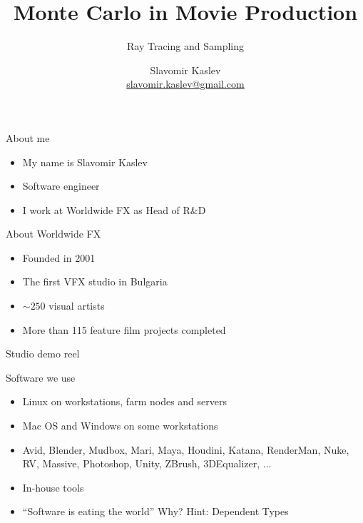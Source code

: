 \documentclass[pdf]
{beamer}
\title{Monte Carlo in Movie Production}
\subtitle{Ray Tracing and Sampling}
\author{Slavomir Kaslev \\
  \href{mailto:slavomir.kaslev@gmail.com}{slavomir.kaslev@gmail.com}}
\begin{document}
\begin{frame}
  \titlepage
\end{frame}

\begin{frame}{About me}
  \begin{itemize}
    \pause
  \item My name is Slavomir Kaslev
    \pause
  \item Software engineer
    \pause
  \item I work at Worldwide FX as Head of R\&D
  \end{itemize}
\end{frame}

\begin{frame}{About Worldwide FX}
  \begin{itemize}
    \pause
  \item Founded in 2001
    \pause
  \item The first VFX studio in Bulgaria
    \pause
  \item $\sim 250$ visual artists
    \pause
  \item More than 115 feature film projects completed
  \end{itemize}
\end{frame}

\begin{frame}{Studio demo reel}
\end{frame}

\begin{frame}{Software we use}
  \begin{itemize}
    \pause
  \item Linux on workstations, farm nodes and servers
    \pause
  \item Mac OS and Windows on some workstations
    \pause
  \item Avid, Blender, Mudbox, Mari, Maya, Houdini, Katana, RenderMan, Nuke, RV, Massive, Photoshop, Unity, ZBrush, 3DEqualizer, ...
    \pause
  \item In-house tools
    \pause
  \item ``Software is eating the world'' \pause Why? \pause Hint: Dependent Types
  \end{itemize}
\end{frame}
\end{document}
